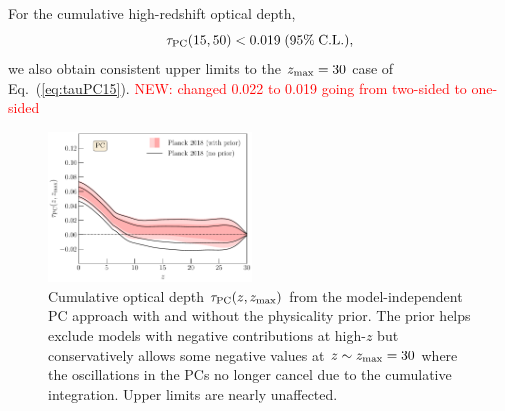\documentclass[prd,twocolumn,amsmath,amssymb,floatfix,superscriptaddress,nofootinbib]{revtex4-1}
\newcommand{\zmax}{z_{\rm max}}
\newcommand{\beq}{\begin{equation}}
\newcommand{\eeq}{\end{equation}}
\newcommand{\ch}[1]{\textcolor{red}{#1}}
\begin{document}
{%
%
%

For the cumulative high-redshift optical depth,
\beq
\tau_{\rm PC}(15, 50) < 0.019 \; (95\%\; \mathrm{C.L.}),
\eeq
we also obtain consistent upper limits to the $\zmax=30$ case of Eq.~(\ref{eq:tauPC15}).
\ch{NEW: changed 0.022 to 0.019 going from two-sided to one-sided}


\begin{figure}[ht]
\includegraphics[width=0.48\textwidth]{paper/plots/pl18_taugtz_pc_zmax30_pl18_srollv2_with_and_without_physicality_prior_do_rescale_tau_false.pdf}
\caption{Cumulative optical depth $\tau_{\rm PC}(z, \zmax)$ from the model-independent PC approach with and without the physicality prior.   The prior helps exclude models with negative contributions at high-$z$ but conservatively allows some negative values at $z \sim z_{\rm max}=30$ where the oscillations in the PCs no longer cancel due to the cumulative integration.  Upper limits are nearly unaffected. 
}
%
\label{fig:plot_taugtz_2018_with_vs_without_physicality_prior}
\end{figure}


}
\end{document}
